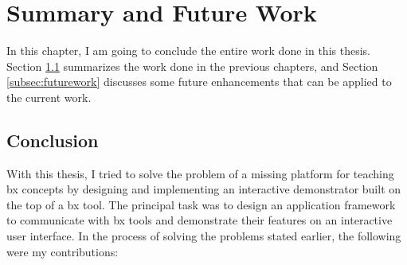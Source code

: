 \section{Summary and Future Work}\label{sec:summary}
In this chapter, I am going to conclude the entire work done in this thesis. Section \ref{subsec:conclusion} summarizes the work done in the previous chapters, and  Section \ref{subsec:futurework} discusses some future enhancements that can be applied to the current work.

\subsection{Conclusion}\label{subsec:conclusion}
With this thesis, I tried to solve the problem of a missing platform for teaching bx concepts by designing and implementing an interactive demonstrator built on the top of a bx tool. The principal task was to design an application framework to communicate with bx tools and demonstrate their features on an interactive user interface. In the process of solving the problems stated earlier, the following were my contributions:

